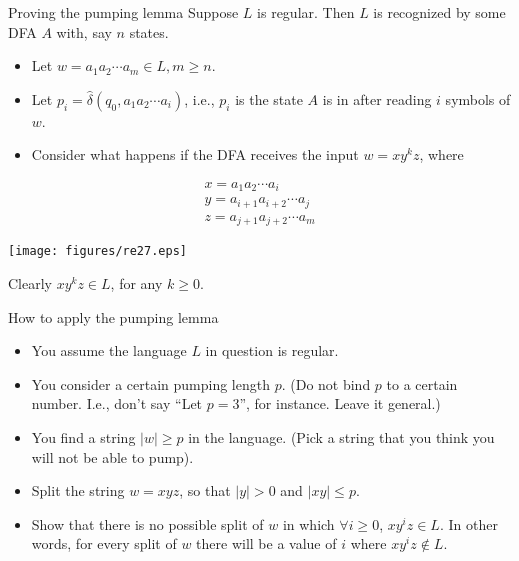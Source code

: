 \documentclass{prosper}%
\begin{document}
\begin{slide}{Proving the pumping lemma}
Suppose $L$ is regular. Then $L$ is recognized by some DFA $A$ with, say $n$ states.
\begin{itemize}
\item Let $w=a_1a_2\cdots a_m \in L, m\geq n$.
\item Let $p_i=\hat{\delta}(q_0, a_1a_2\cdots a_i)$, i.e., $p_i$ is the state $A$ is in after reading $i$ symbols of $w$. 
\item Consider what happens if the DFA receives the input $w=xy^kz$, where
\end{itemize}
\begin{minipage}{6cm}
\[
\begin{array}{l}
x=a_1a_2\cdots a_i \\
y=a_{i+1}a_{i+2}\cdots a_j  \\
z=a_{j+1}a_{j+2}\cdots a_m
\end{array}
\]
\end{minipage}
\begin{minipage}{4cm}
 \texttt{[image: figures/re27.eps]}
\end{minipage}
Clearly  $xy^kz \in L$, for any $k\geq 0$. 
\end{slide}

\begin{slide}{How to apply the pumping lemma}
\begin{itemize}
\item You assume the language $L$ in question is regular.
\item You consider a certain pumping length $p$. (Do not bind $p$ to a certain number. I.e., don't say ``Let $p=3$'', for instance. Leave it general.)
\item You find a string $|w|\geq p$ in the language. (Pick a string that you think you will not be able to pump).
\item Split the string $w=xyz$, so that $|y|>0$ and $|xy|\leq p$.
\item Show that there is no possible split of $w$ in which $\forall i\geq 0$, $xy^iz \in L$. In other words, for every split of $w$ there will be a value of $i$ where $xy^iz \not\in L$.
\end{itemize}
\end{slide}
\end{document}
